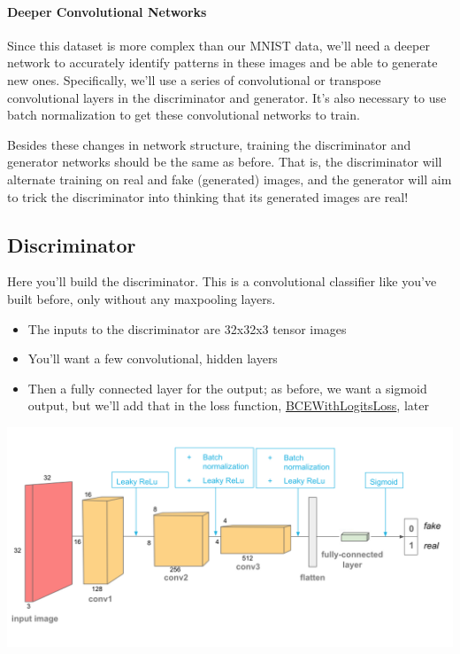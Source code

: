 \paragraph{Deeper Convolutional Networks}

Since this dataset is more complex than our MNIST data, we'll need a
deeper network to accurately identify patterns in these images and be
able to generate new ones. Specifically, we'll use a series of
convolutional or transpose convolutional layers in the discriminator and
generator. It's also necessary to use batch normalization to get these
convolutional networks to train.\newline

Besides these changes in network structure, training the discriminator
and generator networks should be the same as before. That is, the
discriminator will alternate training on real and fake (generated)
images, and the generator will aim to trick the discriminator into
thinking that its generated images are real!

\subsection{Discriminator}

Here you'll build the discriminator. This is a convolutional classifier
like you've built before, only without any maxpooling layers. 
\begin{itemize}
    \item The inputs to the discriminator are 32x32x3 tensor images
    \item You'll want a few convolutional, hidden layers
    \item Then a fully connected layer for the output; as before, we want a sigmoid output, but we'll add that in the loss function, \href{https://pytorch.org/docs/stable/nn.html\#bcewithlogitsloss}{BCEWithLogitsLoss}, later
\end{itemize}

\includegraphics[width=1\linewidth]{img//genAdvNet//deepGAN/conv_discriminator.png}

